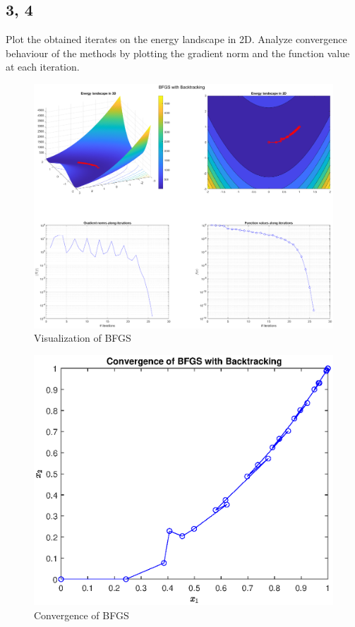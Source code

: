 \documentclass[unicode,11pt,a4paper,oneside,numbers=endperiod,openany]{scrartcl}
\begin{document}
\subsection*{3, 4}
Plot the obtained iterates on the energy landscape in 2D.
Analyze convergence behaviour of the methods by plotting the gradient norm and the function
value at each iteration.

\begin{figure}[H]
    \centering
    \caption{Visualization of BFGS}
    \label{fig:ex2-bfgs-energy}
    \includegraphics[width=\textwidth, trim={4cm 2.5cm 4cm 1.5cm}, clip]{./figures/ex2-bfgs-energy.eps}
\end{figure}

\begin{figure}[H]
    \centering
    \caption{Convergence of BFGS}
    \label{fig:ex2-bfgs-convergence}
    \includegraphics[width=.5\textwidth, trim={0cm 0cm 0cm 0cm}, clip]{./figures/ex2-bfgs-convergence.eps}
\end{figure}
\end{document}

